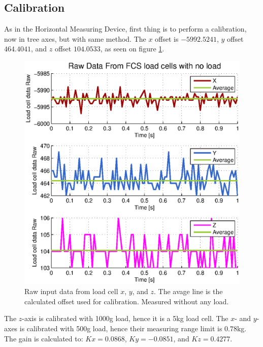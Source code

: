\subsection{Calibration}
As in the Horizontal Measuring Device, first thing is to perform a calibration, now in tree axes, but with same method. The $x$ offset is $-5992.5241$, $y$ offset $464.4041$, and $z$ offset $104.0533$, as seen on figure \ref{fig:fcs-calib-offset}.\\

\begin{figure}[hbtp]
\centering
\includegraphics[scale=1]{graphics/fcs_test/fcs_calib.eps}
\caption{Raw input data from load cell $x$, $y$, and $z$. The avage line is the calculated offset used for calibration. Measured without any load.}
\label{fig:fcs-calib-offset}
\end{figure}

\noindent
The $z$-axis is calibrated with 1000g load, hence it is a 5kg load cell. The $x$- and $y$-axes is calibrated with 500g load, hence their measuring range limit is $0.78$kg. The gain is calculated to: $Kx=0.0868$, $Ky=-0.0851$, and $Kz=0.4277$. 
\\

\newpage
